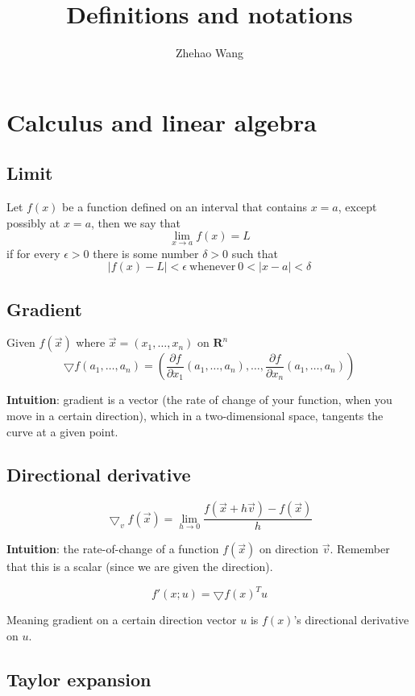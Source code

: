 \documentclass{article}
\begin{document}
\title{Definitions and notations}
\author{Zhehao Wang}

\maketitle{}

\section{Calculus and linear algebra}

\subsection{Limit}

Let $f(x)$ be a function defined on an interval that contains $x = a$, except possibly at $x = a$, then we say that
$$
\lim\limits_{x \to a}{f(x) = L}
$$
if for every $\epsilon > 0$ there is some number $\delta > 0$ such that
$$
|f(x) - L| < \epsilon ~ \text{whenever} ~ 0 < |x - a| < \delta
$$

\subsection{Gradient}
Given $f(\vec{x})$ where $\vec{x} = (x_1, \dots, x_n)$ on $\mathbf{R}^n$
$$
\bigtriangledown f(a_1, \dots, a_n) = (\frac{\partial f}{\partial x_1}(a_1, \dots, a_n), \dots, \frac{\partial f}{\partial x_n}(a_1, \dots, a_n))
$$

\textbf{Intuition}: gradient is a vector (the rate of change of your function, when you move in a certain direction), which in a two-dimensional space, tangents the curve at a given point.

\subsection{Directional derivative}

$$
\bigtriangledown_v f(\vec{x}) = \lim\limits_{h \to 0}{\frac{f(\vec{x} + h\vec{v}) - f(\vec{x})}{h}}
$$

\textbf{Intuition}: the rate-of-change of a function $f(\vec{x})$ on direction $\vec{v}$.
Remember that this is a scalar (since we are given the direction).

$$
f'(x; u) = \bigtriangledown f(x)^{T} u
$$

Meaning gradient on a certain direction vector $u$ is $f(x)$'s directional derivative on $u$.

\subsection{Taylor expansion}
\end{document}
